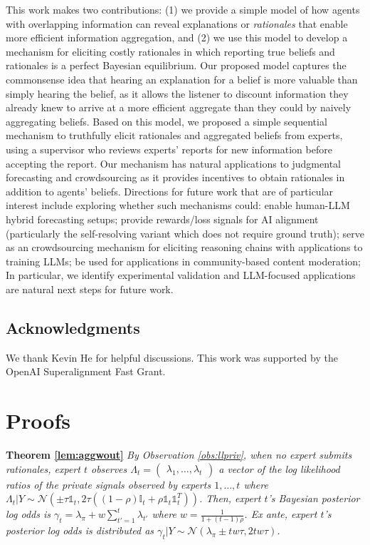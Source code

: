 \documentclass{winnower}
\begin{document}
This work makes two contributions: (1) we provide a simple model of how agents with overlapping information can reveal explanations or \emph{rationales} that enable more efficient information aggregation, and (2) we use this model to develop a mechanism for eliciting costly rationales in which reporting true beliefs and rationales is a perfect Bayesian equilibrium. Our proposed model captures the commonsense idea that hearing an explanation for a belief is more valuable than simply hearing the belief, as it allows the listener to discount information they already knew to arrive at a more efficient aggregate than they could by naively aggregating beliefs. Based on this model, we proposed a simple sequential mechanism to truthfully elicit rationales and aggregated beliefs from experts, using a supervisor who reviews experts' reports for new information before accepting the report. Our mechanism has natural applications to judgmental forecasting and crowdsourcing as it provides incentives to obtain rationales in addition to agents' beliefs.  Directions for future work that are of particular interest include exploring whether such mechanisms could: enable human-LLM hybrid forecasting setups; provide rewards/loss signals for AI alignment (particularly the self-resolving variant which does not require ground truth); serve as an crowdsourcing mechanism for eliciting reasoning chains with applications to training LLMs; be used for applications in community-based content moderation;  In particular, we identify experimental validation and LLM-focused applications are natural next steps for future work.

\subsection*{Acknowledgments}
We thank Kevin He for helpful discussions. This work was supported by the OpenAI Superalignment Fast Grant.




\appendix
\section{Proofs}


\textbf{Theorem \ref{lem:aggwout}}
    \emph{By Observation \ref{obs:llpriv}, when no expert submits rationales, expert $t$ observes $\Lambda_{t} = \begin{pmatrix} {\lambda}_1, \ldots, {\lambda}_{t} \end{pmatrix}$ a vector of the log likelihood ratios of the private signals observed by experts $1, \ldots, t$ where $\Lambda_{t}|Y \sim \mathcal{N}\left(\pm \tau \mathds{1}_{t}, 2\tau((1-\rho)\mathbb{I}_t + \rho\mathds{1}_t\mathds{1}_t^T) \right)$. Then, expert $t$'s Bayesian posterior log odds is $\gamma_t =\lambda_\pi +  w\sum_{t'=1}^t \lambda_{t'}$ where $w = \frac{1}{1+(t-1)\rho}$. Ex ante, expert $t$'s posterior log odds is distributed as $\gamma_t|Y \sim \mathcal{N}\left(\lambda_\pi \pm tw\tau , 2tw\tau\right)$.}
\end{document}
